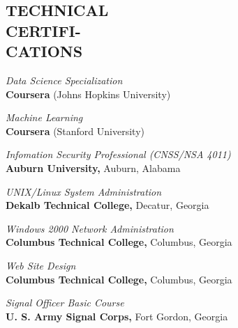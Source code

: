 \documentclass[margin, 11pt]{res} %
\begin{document}
\begin{resume}
 


\section{TECHNICAL\\CERTIFI-\\CATIONS}

{\it Data Science Specialization} \\
\textbf{Coursera} (Johns Hopkins University)

{\it Machine Learning} \\
\textbf{Coursera} (Stanford University)

{\it Infomation Security Professional (CNSS/NSA 4011)} \\
\textbf{Auburn University,} Auburn, Alabama

{\it UNIX/Linux System Administration} \\
\textbf{Dekalb Technical College,} Decatur, Georgia

{\it Windows 2000 Network Administration} \\
\textbf{Columbus Technical College,} Columbus, Georgia

{\it Web Site Design} \\
\textbf{Columbus Technical College,} Columbus, Georgia

{\it Signal Officer Basic Course} \\
\textbf{U. S. Army Signal Corps,} Fort Gordon, Georgia


\end{resume}
\end{document}
